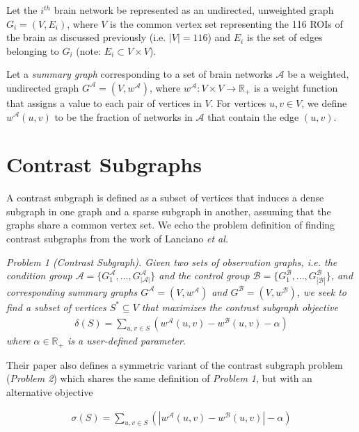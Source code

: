 \documentclass[sigconf]{acmart}
\begin{document}
Let the $i^{th}$ brain network be represented as an undirected, unweighted graph $G_i = (V, E_i)$, where $V$ is the common vertex set representing the 116 ROIs of the brain as discussed previously (i.e. $|V| = 116$) and $E_i$ is the set of edges belonging to $G_i$ (note: $E_i \subset V \times V$).

Let a \emph{summary graph} corresponding to a set of brain networks $\mathcal{A}$ be a weighted, undirected graph $G^{\mathcal{A}} = (V, w^{\mathcal{A}})$, where $w^{\mathcal{A}}: V \times V \rightarrow \mathbb{R}_+$ is a weight function that assigns a value to each pair of vertices in $V$.
For vertices $u,v \in V$, we define $w^{\mathcal{A}}(u,v)$ to be the fraction of networks in $\mathcal{A}$ that contain the edge $(u,v)$.

\section{Contrast Subgraphs} \label{cs}

A contrast subgraph is defined as a subset of vertices that induces a dense subgraph in one graph and a sparse subgraph in another, assuming that the graphs share a common vertex set.
We echo the problem definition of finding contrast subgraphs from the work of Lanciano \emph{et al.}

\emph{Problem 1 (Contrast Subgraph). Given two sets of observation graphs, i.e. the condition group $\mathcal{A} = \{G^{\mathcal{A}}_1, . . . , G^{\mathcal{A}}_{|\mathcal{A}|}\}$ and the control group $\mathcal{B} = \{G^{\mathcal{B}}_1, . . . , G^{\mathcal{B}}_{|\mathcal{B}|}\}$, and corresponding summary graphs $G^{\mathcal{A}} = (V, w^{\mathcal{A}})$ and $G^{\mathcal{B}} = (V, w^{\mathcal{B}})$, we seek to find a subset of vertices $S^* \subseteq V$ that maximizes the contrast subgraph objective}
\begin{align*}
    \delta (S) = \sum_{u,v \in S} \left(w^{\mathcal{A}}(u,v) - w^{\mathcal{B}}(u,v) - \alpha\right)
\end{align*}
\emph{where $\alpha \in \mathbb{R}_+$ is a user-defined parameter.}

Their paper also defines a symmetric variant of the contrast subgraph problem (\emph{Problem 2}) which shares the same definition of \emph{Problem 1}, but with an alternative objective

\begin{align*}
    \sigma (S) = \sum_{u,v \in S} \left(|w^{\mathcal{A}}(u,v) - w^{\mathcal{B}}(u,v)| - \alpha\right)
\end{align*}
\end{document}
